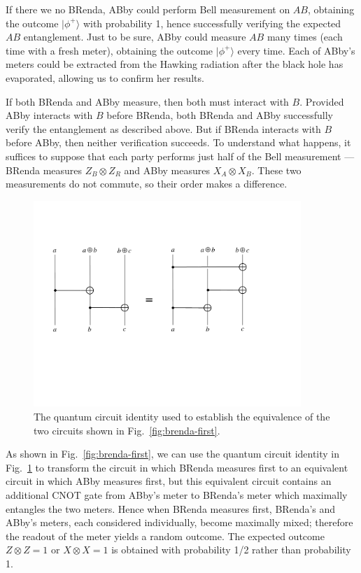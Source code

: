 \documentclass[11pt]{article}
\begin{document}
If there we no BRenda, ABby could perform Bell measurement on $AB$, obtaining the outcome $|\phi^+\rangle$ with probability 1, hence successfully verifying the expected $AB$ entanglement. Just to be sure, ABby could measure $AB$ many times (each time with a fresh meter), obtaining the outcome $|\phi^+\rangle$ every time. Each of ABby's meters could be extracted from the Hawking radiation after the black hole has evaporated, allowing us to confirm her results. 

If both BRenda and ABby measure, then both must interact with $B$. Provided ABby interacts with $B$ before BRenda, both BRenda and ABby successfully verify the entanglement as described above. But if BRenda interacts with $B$ before ABby, then neither verification succeeds. To understand what happens, it suffices to suppose that each party performs just half of the Bell measurement --- BRenda measures $Z_B\otimes Z_R$ and ABby measures $X_A\otimes X_B$. These two measurements do not commute, so their order makes a difference. 

\begin{figure}[t]
\begin{center}
\includegraphics[width=0.9\textwidth]{cnot-identity.pdf}
\end{center}
\caption{The quantum circuit identity used to establish the equivalence of the two circuits shown in Fig.~\ref{fig:brenda-first}.}
\label{fig:cnot-identity}
\end{figure}

As shown in Fig.~\ref{fig:brenda-first}, we can use the quantum circuit identity in Fig.~\ref{fig:cnot-identity} to transform the circuit in which BRenda measures first to an equivalent circuit in which ABby measures first, but this equivalent circuit contains an additional CNOT gate from ABby's meter to BRenda's meter which maximally entangles the two meters. Hence when BRenda measures first, BRenda's and ABby's meters, each considered individually, become maximally mixed; therefore the readout of the meter yields a random outcome. The expected outcome $Z\otimes Z=1$ or $X\otimes X = 1$ is obtained with probability 1/2 rather than probability 1. 
\end{document}
